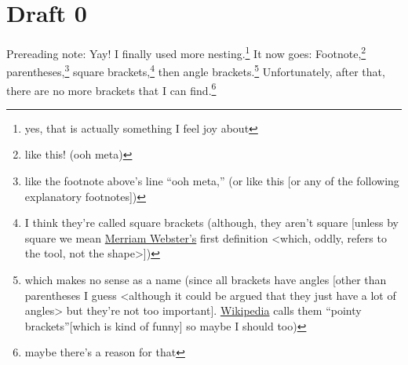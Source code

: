 \documentclass[a4paper]{article}
\newcommand{\say}[1]{``#1''}
\newcommand{\1}{\={a}}
\newcommand{\2}{\={e}}
\newcommand{\3}{\={\i}}
\newcommand{\4}{\=o}
\newcommand{\5}{\=u}
\newcommand{\6}{\={A}}
\newcommand{\<}{\textless}
\renewcommand{\>}{\textgreater}
\renewcommand{\,}{\textsuperscript{,}}
\begin{document}
\section{Draft 0}
Prereading note: Yay! I finally used more nesting.\footnote{yes, that is actually something I feel joy about}
It now goes: Footnote,\footnote{like this! (ooh meta)} parentheses,\footnote{like the footnote above's line \say{ooh meta,} (or like this [or any of the following explanatory footnotes])} square brackets,\footnote{I think they're called square brackets (although, they aren't square [unless by square we mean \href{https://www.merriam-webster.com/dictionary/square}{Merriam Webster's} first definition \<which, oddly, refers to the tool, not the shape\>])} then angle brackets.\footnote{which makes no sense as a name (since all brackets have angles [other than parentheses I guess \<although it could be argued that they just have a lot of angles\> but they're not too important]. \href{https://en.wikipedia.org/wiki/Bracket}{Wikipedia} calls them \say{pointy brackets}[which is kind of funny] so maybe I should too)}
Unfortunately, after that, there are no more brackets that I can find.\footnote{maybe there's a reason for that}
\end{document}
